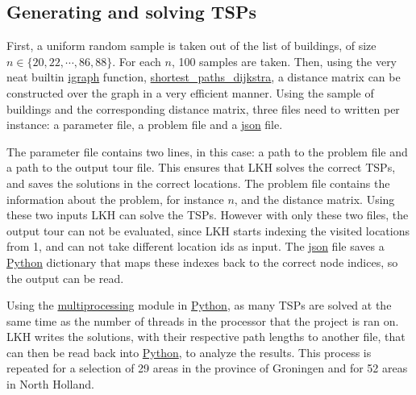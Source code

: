 \subsection{Generating and solving TSPs}
First, a uniform random sample is taken out of the list of buildings, of size\\
$n\in\{20, 22, \cdots, 86, 88\}$. For each $n$, 100 samples are taken. Then, using the very neat
builtin \url{igraph} function, \url{shortest_paths_dijkstra}, a distance matrix can be constructed
over the graph in a very efficient manner. Using the sample of buildings and the corresponding 
distance matrix, three files need to written per instance: a parameter file, a problem file and a 
\url{json} file.

The parameter file contains two lines, in this case: a path to the problem file and a path to the
output tour file. This ensures that LKH solves the correct TSPs, and saves the solutions in the 
correct locations. The problem file contains the information about the problem, for instance
$n$, and the distance matrix. Using these two inputs LKH can solve the TSPs. However with only these 
two files, the output tour can not be evaluated, since LKH starts indexing the visited locations
from 1, and can not take different location ids as input. The \url{json} file saves a \url{Python}
dictionary that maps these indexes back to the correct node indices, so the output can be read.

Using the \url{multiprocessing} module in \url{Python}, as many TSPs are solved at the same time
as the number of threads in the processor that the project is ran on. LKH writes the solutions,
with their respective path lengths to another file, that can then be read back into \url{Python},
to analyze the results. This process is repeated for a selection of 29 areas in the province of
Groningen and for 52 areas in North Holland.

